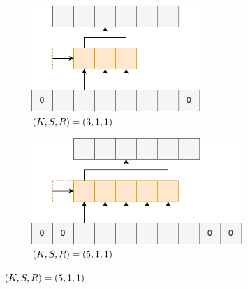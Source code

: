 \documentclass[12pt]{jarticle}
\numberwithin{equation}{section}    %
\numberwithin{figure}{section}      %
\numberwithin{table}{section}      %
\begin{document}
\begin{figure}[tb]
    \centering
    \begin{subfigure}[b]{0.48\textwidth}
        \centering
        \includegraphics[height=4cm]{./figure/sec3/conv1.drawio.png}
        \caption{$(K, S, R) = (3, 1, 1)$}
        \label{sec3:fig:conv1}
    \end{subfigure}
    \begin{subfigure}[b]{0.48\textwidth}
        \centering
        \includegraphics[height=4cm]{./figure/sec3/conv2.drawio.png}
        \caption{$(K, S, R) = (5, 1, 1)$}
        \label{sec3:fig:conv2}
    \end{subfigure}

    \vspace{0.5cm}


\end{figure}
\end{document}
